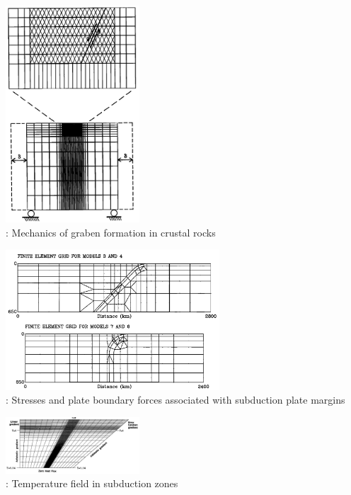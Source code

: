\begin{center}
\begin{minipage}{0.35\textwidth}
\centering
\includegraphics[width=5cm]{images/history/mewi89}\\
{: Mechanics of graben formation in crustal rocks \cite{mewi89}}
\end{minipage}\hfill
\begin{minipage}{0.55\textwidth}
\centering
\includegraphics[width=8cm]{images/history/whbw92}\\
{: Stresses and plate boundary forces associated with subduction plate margins
\cite{whbw92}}
\end{minipage}
\end{center}


\begin{center}
\includegraphics[width=5cm]{images/history/dast92}\\
{: Temperature field in subduction zones \cite{dast92}}
\end{center}


